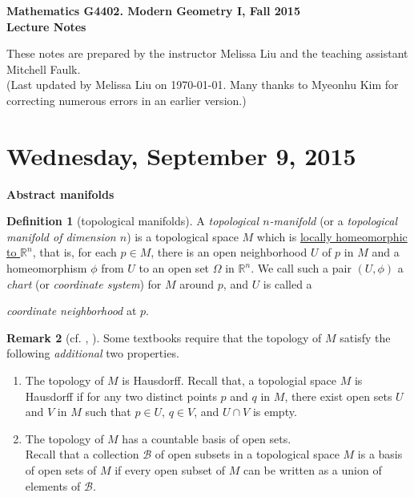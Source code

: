 \documentclass{amsart}
\numberwithin{equation}{section}
\newcommand{\bR}{\mathbb{R}}
\theoremstyle{definition}
\newtheorem{definition}{Definition} [section]
\newtheorem{remark}[definition]{Remark}
\theoremstyle{theorem}
\begin{document}


\begin{center}
{\large \bf Mathematics G4402. Modern Geometry I, Fall 2015\\ Lecture Notes}
\end{center}

\bigskip

\noindent
These notes are prepared by the instructor Melissa Liu and the teaching assistant Mitchell Faulk.\\
 {\small (Last updated by Melissa Liu on \today. Many thanks 
to Myeonhu Kim for correcting numerous errors in an earlier version.)}

 
\tableofcontents
 
\section{Wednesday, September 9, 2015}


\noindent
{\bf \large Abstract manifolds}

\begin{definition}[topological manifolds] 
A {\em topological $n$-manifold} (or a {\em topological manifold of dimension $n$}) is a topological space $M$ which is 
\underline{locally homeomorphic to $\mathbb{R}^n$}, that is, for each $p \in M$, there is an open neighborhood $U$ of $p$ in $M$ 
and a homeomorphism $\phi$ from $U$ to an open set $\Omega$ in $\bR^n$. 
We call such a pair $(U,\phi)$ a {\em chart} (or {\em coordinate system}) for $M$ around $p$, and $U$ is called a 

{\em coordinate neighborhood} at $p$. 
\end{definition}

\begin{remark}[{cf. \cite[page 6]{Bo}, \cite[page 29-30]{dC}}] 
Some textbooks  require that the topology of $M$ satisfy the following \emph{additional} two properties. 
\begin{enumerate}
\item[(i)] The topology of $M$ is Hausdorff.
Recall that, a topologial space $M$ is Hausdorff if for any two distinct points
$p$ and $q$ in $M$, there exist open sets $U$ and $V$ in $M$ such that $p\in U$, $q\in V$, and $U\cap V$ is empty. 
\item[(ii)] The topology of $M$ has a countable basis of open sets.\\ 
Recall that a collection $\mathcal{B}$ of open subsets in a topological space $M$ is a basis of open sets of $M$
if every open subset of $M$ can be written as a union of elements of $\mathcal{B}$. 
\end{enumerate}
\end{remark}
\end{document}
